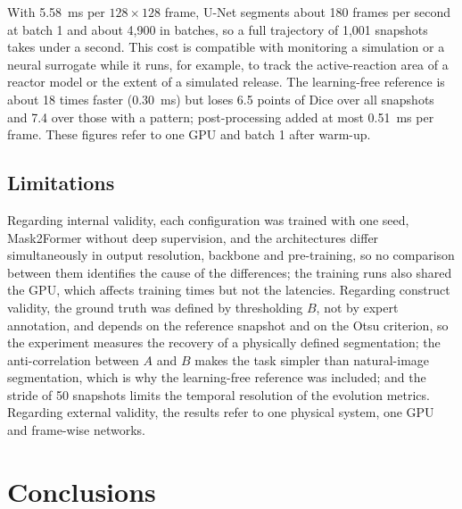 \documentclass[final,5p,times,twocolumn]{elsarticle}
\begin{document}
With 5.58~ms per $128\times128$ frame, U-Net segments about 180 frames per second at batch 1 and about 4,900 in batches, so a full trajectory of 1,001 snapshots takes under a second. This cost is compatible with monitoring a simulation or a neural surrogate while it runs, for example, to track the active-reaction area of a reactor model or the extent of a simulated release. The learning-free reference is about 18 times faster (0.30~ms) but loses 6.5 points of Dice over all snapshots and 7.4 over those with a pattern; post-processing added at most 0.51~ms per frame. These figures refer to one GPU and batch 1 after warm-up.

\subsection{Limitations}\label{subsec:limitations}

Regarding internal validity, each configuration was trained with one seed, Mask2Former without deep supervision, and the architectures differ simultaneously in output resolution, backbone and pre-training, so no comparison between them identifies the cause of the differences; the training runs also shared the GPU, which affects training times but not the latencies. Regarding construct validity, the ground truth was defined by thresholding $B$, not by expert annotation, and depends on the reference snapshot and on the Otsu criterion, so the experiment measures the recovery of a physically defined segmentation; the anti-correlation between $A$ and $B$ makes the task simpler than natural-image segmentation, which is why the learning-free reference was included; and the stride of 50 snapshots limits the temporal resolution of the evolution metrics. Regarding external validity, the results refer to one physical system, one GPU and frame-wise networks.

\section{Conclusions}\label{sec:conclusions}
\end{document}
